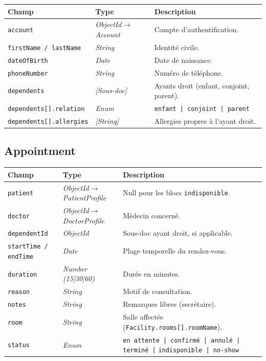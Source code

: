 \documentclass[12pt,a4paper]{report}
\newcommand{\field}[1]{\texttt{\small\textcolor{MedTealDark}{#1}}}
\newcommand{\typ}[1]{\textit{\small\textcolor{CommentGray}{#1}}}
\begin{document}
\begin{center}
\small
\begin{tabularx}{\textwidth}{@{} l l X @{}}
  \toprule
  \textbf{Champ} & \textbf{Type} & \textbf{Description} \\
  \midrule
  \field{account}             & \typ{ObjectId$\to$Account}  & Compte d'authentification. \\
  \field{firstName / lastName}& \typ{String}                & Identité civile. \\
  \field{dateOfBirth}         & \typ{Date}                  & Date de naissance. \\
  \field{phoneNumber}         & \typ{String}                & Numéro de téléphone. \\
  \field{dependents}          & \typ{[Sous-doc]}            & Ayants droit (enfant, conjoint, parent). \\
  \field{dependents[].relation}& \typ{Enum}                 & \texttt{enfant | conjoint | parent} \\
  \field{dependents[].allergies}& \typ{[String]}            & Allergies propres à l'ayant droit. \\
  \bottomrule
\end{tabularx}
\end{center}

\subsection{Appointment}

\begin{center}
\small
\begin{tabularx}{\textwidth}{@{} l l X @{}}
  \toprule
  \textbf{Champ} & \textbf{Type} & \textbf{Description} \\
  \midrule
  \field{patient}             & \typ{ObjectId$\to$PatientProfile} & Null pour les blocs \texttt{indisponible}. \\
  \field{doctor}              & \typ{ObjectId$\to$DoctorProfile}  & Médecin concerné. \\
  \field{dependentId}         & \typ{ObjectId}                    & Sous-doc ayant droit, si applicable. \\
  \field{startTime / endTime} & \typ{Date}                        & Plage temporelle du rendez-vous. \\
  \field{duration}            & \typ{Number (15|30|60)}           & Durée en minutes. \\
  \field{reason}              & \typ{String}                      & Motif de consultation. \\
  \field{notes}               & \typ{String}                      & Remarques libres (secrétaire). \\
  \field{room}                & \typ{String}                      & Salle affectée (\texttt{Facility.rooms[].roomName}). \\
  \field{status}              & \typ{Enum}                        &
    \texttt{en attente | confirmé | annulé | terminé |}
    \texttt{indisponible | no-show} \\
  \bottomrule
\end{tabularx}
\end{center}
\end{document}

